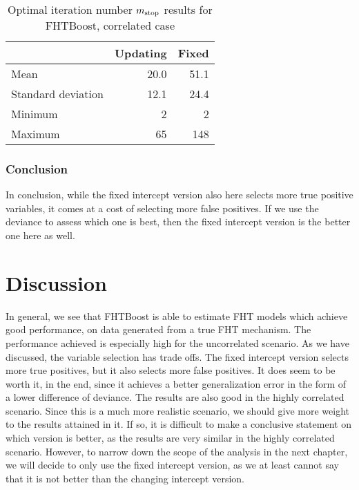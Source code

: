 \begin{table}
\caption{Optimal iteration number $m_{\text{stop}}$ results for FHTBoost, correlated case}
\label{table:correlated-mstop}
\centering
\begin{tabular}{l|rr}
\toprule
& Updating & Fixed \\
\hline
Mean               &  20.0  &  51.1  \\
Standard deviation &  12.1  &  24.4  \\
Minimum            &     2  &     2  \\
Maximum            &    65  &   148  \\
\bottomrule
\end{tabular}
\end{table}

\subsubsection{Conclusion}
In conclusion, while the fixed intercept version also here selects more true positive variables, it comes at a cost of selecting more false positives.
If we use the deviance to assess which one is best, then the fixed intercept version is the better one here as well.

\section{Discussion}
In general, we see that FHTBoost is able to estimate FHT models which achieve good performance, on data generated from a true FHT mechanism.
The performance achieved is especially high for the uncorrelated scenario.
As we have discussed, the variable selection has trade offs.
The fixed intercept version selects more true positives, but it also selects more false positives.
It does seem to be worth it, in the end, since it achieves a better generalization error in the form of a lower difference of deviance.
The results are also good in the highly correlated scenario.
Since this is a much more realistic scenario, we should give more weight to the results attained in it.
If so, it is difficult to make a conclusive statement on which version is better, as the results are very similar in the highly correlated scenario.
However, to narrow down the scope of the analysis in the next chapter, we will decide to only use the fixed intercept version, as we at least cannot say that it is not better than the changing intercept version.